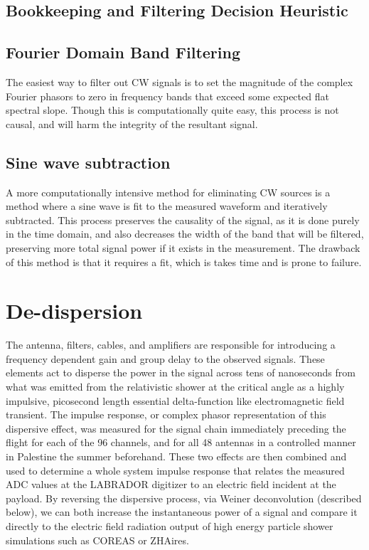 	\subsection{Bookkeeping and Filtering Decision Heuristic}
	\subsection{Fourier Domain Band Filtering}
			The easiest way to filter out CW signals is to set the magnitude of the complex Fourier phasors to zero in frequency bands that exceed some expected flat spectral slope.  Though this is computationally quite easy, this process is not causal, and will harm the integrity of the resultant signal.
		\subsection{Sine wave subtraction}
			A more computationally intensive method for eliminating CW sources is a method where a sine wave is fit to the measured waveform and iteratively subtracted.  This process preserves the causality of the signal, as it is done purely in the time domain, and also decreases the width of the band that will be filtered, preserving more total signal power if it exists in the measurement.  The drawback of this method is that it requires a fit, which is takes time and is prone to failure.


\section{De-dispersion}
	The antenna, filters, cables, and amplifiers are responsible for introducing a frequency dependent gain and group delay to the observed signals.  These elements act to disperse the power in the signal across tens of nanoseconds from what was emitted from the relativistic shower at the critical angle as a highly impulsive, picosecond length essential delta-function like electromagnetic field transient.  The impulse response, or complex phasor representation of this dispersive effect, was measured for the signal chain immediately preceding the flight for each of the 96 channels, and for all 48 antennas in a controlled manner in Palestine the summer beforehand.  These two effects are then combined and used to determine a whole system impulse response that relates the measured ADC values at the LABRADOR digitizer to an electric field incident at the payload.  By reversing the dispersive process, via Weiner deconvolution (described below), we can both increase the instantaneous power of a signal and compare it directly to the electric field radiation output of high energy particle shower simulations such as COREAS or ZHAires.
